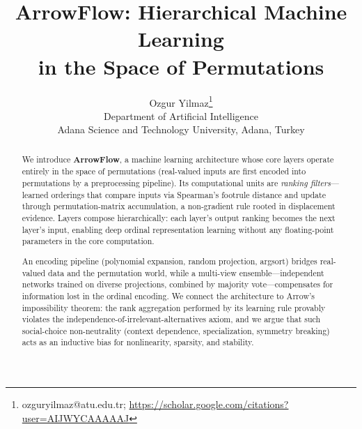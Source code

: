 \documentclass[12pt]{article}
\begin{document}
\title{ArrowFlow: Hierarchical Machine Learning\\in the Space of Permutations}
\author{Ozgur Yilmaz\footnote{ozguryilmaz@atu.edu.tr; \url{https://scholar.google.com/citations?user=AIJWYCAAAAAJ}} \\
\small Department of Artificial Intelligence\\
\small Adana Science and Technology University, Adana, Turkey}
\date{}
\maketitle

\begin{abstract}
We introduce \textbf{ArrowFlow}, a machine learning architecture whose core layers operate entirely in the space of permutations (real-valued inputs are first encoded into permutations by a preprocessing pipeline). Its computational units are \emph{ranking filters}---learned orderings that compare inputs via Spearman's footrule distance and update through permutation-matrix accumulation, a non-gradient rule rooted in displacement evidence. Layers compose hierarchically: each layer's output ranking becomes the next layer's input, enabling deep ordinal representation learning without any floating-point parameters in the core computation.

An encoding pipeline (polynomial expansion, random projection, argsort) bridges real-valued data and the permutation world, while a multi-view ensemble---independent networks trained on diverse projections, combined by majority vote---compensates for information lost in the ordinal encoding. We connect the architecture to Arrow's impossibility theorem: the rank aggregation performed by its learning rule provably violates the independence-of-irrelevant-alternatives axiom, and we argue that such social-choice non-neutrality (context dependence, specialization, symmetry breaking) acts as an inductive bias for nonlinearity, sparsity, and stability.


\end{abstract}
\end{document}
